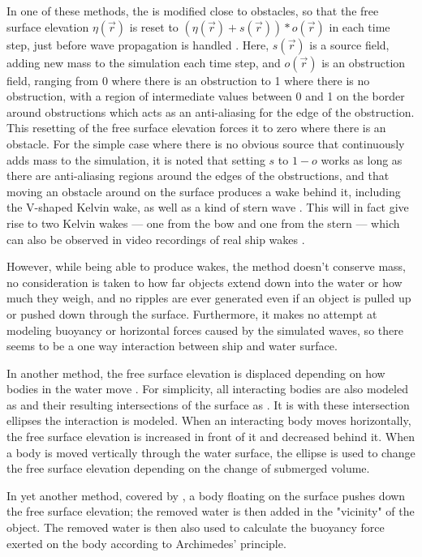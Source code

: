 In one of these methods, the \PDE is modified close to obstacles, so that the free surface elevation $\eta(\vec{r})$ is reset to $(\eta(\vec{r}) + s(\vec{r})) * o(\vec{r})$ in each time step, just before wave propagation is handled \citep{Tessendorf2004}. Here, $s(\vec{r})$ is a source field, adding new mass to the simulation each time step, and $o(\vec{r})$ is an obstruction field, ranging from 0 where there is an obstruction to 1 where there is no obstruction, with a region of intermediate values between 0 and 1 on the border around obstructions which acts as an anti-aliasing for the edge of the obstruction. This resetting of the free surface elevation forces it to zero where there is an obstacle. For the simple case where there is no obvious source that continuously adds mass to the simulation, it is noted that setting $s$ to $1-o$ works as long as there are anti-aliasing regions around the edges of the obstructions, and that moving an obstacle around on the surface produces a wake behind it, including the V-shaped Kelvin wake, as well as a kind of stern wave \citep{Tessendorf2004}. This will in fact give rise to two Kelvin wakes --- one from the bow and one from the stern --- which can also be observed in video recordings of real ship wakes \citep{Alivewithpassion2007,MatteoBram2007}.

However, while being able to produce wakes, the method doesn't conserve mass, no consideration is taken to how far objects extend down into the water or how much they weigh, and no ripples are ever generated even if an object is pulled up or pushed down through the surface. Furthermore, it makes no attempt at modeling buoyancy or horizontal forces caused by the simulated waves, so there seems to be a one way interaction between ship and water surface.

In another method, the free surface elevation is displaced depending on how bodies in the water move \citep{Ottosson2011}. For simplicity, all interacting bodies are also modeled as \ellipsoids and their resulting intersections of the surface as \ellipses. It is with these intersection ellipses the interaction is modeled. When an interacting body moves horizontally, the free surface elevation is increased in front of it and decreased behind it. When a body is moved vertically through the water surface, the ellipse is used to change the free surface elevation depending on the change of submerged volume.

In yet another method, covered by \citet{Muller2007}, a body floating on the surface pushes down the free surface elevation; the removed water is then added in the "vicinity" of the object. The removed water is then also used to calculate the buoyancy force exerted on the body according to Archimedes' principle.

